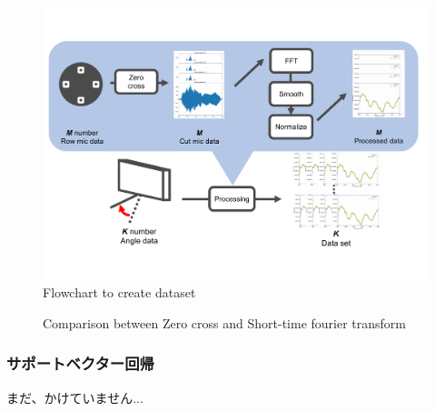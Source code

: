 \begin{figure}[ht]
  \begin{center}
  \vspace{1zh}
    \includegraphics[width=\linewidth]{images/2_how_to_make_data_set.pdf}   
  \end{center}
  \vspace{-2zh}
  \caption{Flowchart to create dataset}
  \label{fig:flow_data_set}
\end{figure}

\begin{figure}[ht]
  \centering
  \label{fig:0cross}
  \centering
  \label{fig:stft}
 \caption{Comparison between Zero cross and Short-time fourier transform}\label{fig:compare_stft_0cross}
\end{figure}

\subsubsection{サポートベクター回帰}
\label{sec:support_vector_regression}
まだ、かけていません...

\clearpage
\newpage